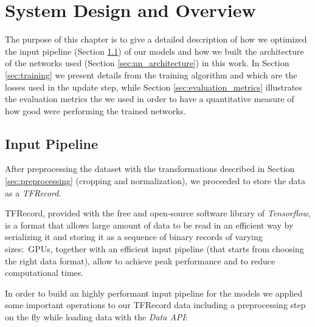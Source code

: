 \chapter{System Design and Overview}
\label{cha:4th_chapter}

The purpose of this chapter is to give a detailed description of how we optimized the input pipeline (Section \ref{sec:input_pipeline}) of our models and how we built the architecture of the networks used (Section \ref{sec:nn_architecture}) in this work. 
In Section \ref{sec:training} we present details from the training algorithm and which are the losses used in the update step, while Section \ref{sec:evaluation_metrics} illustrates the evaluation metrics the we used in order to have a quantitative measure of how good were performing the trained networks.

\section{Input Pipeline}
\label{sec:input_pipeline}
After preprocessing the dataset with the transformations described in Section \ref{sec:preprocessing} (cropping and normalization), we proceeded to store the data as a \textit{TFRecord}. 


TFRecord, provided with the free and open-source software library of \textit{Tensorflow}, is a format that allows large amount of data to be read in an efficient way \cite{tfrecord} by serializing it and storing it as a sequence of binary records of varying sizes:~\ac{GPU}s, together with an efficient input pipeline (that starts from choosing the right data format), allow to achieve peak performance and to reduce computational times.

\vspace{2mm} %
In order to build an highly performant input pipeline for the models we applied some important operations to our TFRecord data including a preprocessing step on the fly while loading data with the \textit{Data API}:

